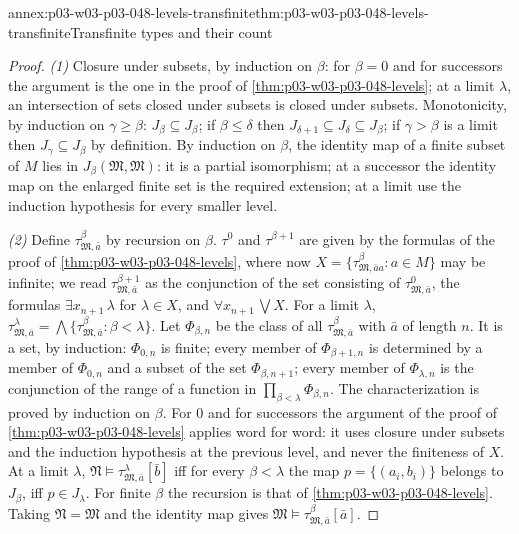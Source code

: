 \begin{annexitem}{annex:p03-w03-p03-048-levels-transfinite}{thm:p03-w03-p03-048-levels-transfinite}{Transfinite types and their count}
\begin{proof}
\emph{(1)}  Closure under subsets, by induction on \(\beta\): for
\(\beta=0\) and for successors the argument is the one in the proof of
\cref{thm:p03-w03-p03-048-levels}; at a limit \(\lambda\), an intersection
of sets closed under subsets is closed under subsets.  Monotonicity, by
induction on \(\gamma\geq\beta\): \(J_\beta\subseteq J_\beta\); if
\(\beta\leq\delta\) then \(J_{\delta+1}\subseteq J_\delta\subseteq J_\beta\);
if \(\gamma>\beta\) is a limit then \(J_\gamma\subseteq J_\beta\) by
definition.  By induction on \(\beta\), the identity map of a finite subset
of \(M\) lies in \(J_\beta(\mathfrak M,\mathfrak M)\): it is a partial
isomorphism; at a successor the identity map on the enlarged finite set is
the required extension; at a limit use the induction hypothesis for every
smaller level.

\emph{(2)}  Define \(\tau^{\beta}_{\mathfrak M,\bar a}\) by recursion on
\(\beta\).  \(\tau^{0}\) and \(\tau^{\beta+1}\) are given by the formulas of
the proof of \cref{thm:p03-w03-p03-048-levels}, where now
\(X=\{\tau^{\beta}_{\mathfrak M,\bar aa}:a\in M\}\) may be infinite; we read
\(\tau^{\beta+1}_{\mathfrak M,\bar a}\) as the conjunction of the set
consisting of \(\tau^0_{\mathfrak M,\bar a}\), the formulas
\(\exists x_{n+1}\,\lambda\) for \(\lambda\in X\), and \(\forall x_{n+1}\,
\bigvee X\).  For a limit \(\lambda\), \(\tau^{\lambda}_{\mathfrak M,\bar a}=
\bigwedge\{\tau^{\beta}_{\mathfrak M,\bar a}:\beta<\lambda\}\).  Let
\(\Phi_{\beta,n}\) be the class of all \(\tau^{\beta}_{\mathfrak M,\bar a}\)
with \(\bar a\) of length \(n\).  It is a set, by induction: \(\Phi_{0,n}\) is
finite; every member of \(\Phi_{\beta+1,n}\) is determined by a member of
\(\Phi_{0,n}\) and a subset of the set \(\Phi_{\beta,n+1}\); every member of
\(\Phi_{\lambda,n}\) is the conjunction of the range of a function in
\(\prod_{\beta<\lambda}\Phi_{\beta,n}\).  The characterization is proved by
induction on \(\beta\).  For \(0\) and for successors the argument of the
proof of \cref{thm:p03-w03-p03-048-levels} applies word for word: it uses
closure under subsets and the induction hypothesis at the previous level,
and never the finiteness of \(X\).  At a limit \(\lambda\),
\(\mathfrak N\models\tau^{\lambda}_{\mathfrak M,\bar a}[\bar b]\) iff for
every \(\beta<\lambda\) the map \(p=\{(a_i,b_i)\}\) belongs to \(J_\beta\),
iff \(p\in J_\lambda\).  For finite \(\beta\) the recursion is that of
\cref{thm:p03-w03-p03-048-levels}.  Taking \(\mathfrak N=\mathfrak M\) and the
identity map gives \(\mathfrak M\models\tau^{\beta}_{\mathfrak M,\bar a}[\bar
a]\).


\end{proof}
\end{annexitem}

